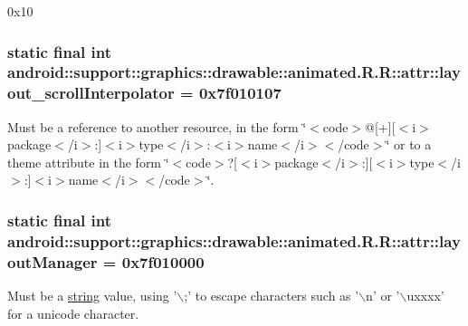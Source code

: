0x10\hypertarget{classandroid_1_1support_1_1graphics_1_1drawable_1_1animated_1_1_r_1_1attr_dc8d41cc769da401537d14c50cbd5109}{
\subsubsection[{layout\_\-scrollInterpolator}]{\setlength{\rightskip}{0pt plus 5cm}static final int android::support::graphics::drawable::animated.R.R::attr::layout\_\-scrollInterpolator = 0x7f010107}}
\label{classandroid_1_1support_1_1graphics_1_1drawable_1_1animated_1_1_r_1_1attr_dc8d41cc769da401537d14c50cbd5109}


Must be a reference to another resource, in the form \char`\"{}$<$code$>$@\mbox{[}+\mbox{]}\mbox{[}$<$i$>$package$<$/i$>$:\mbox{]}$<$i$>$type$<$/i$>$:$<$i$>$name$<$/i$>$$<$/code$>$\char`\"{} or to a theme attribute in the form \char`\"{}$<$code$>$?\mbox{[}$<$i$>$package$<$/i$>$:\mbox{]}\mbox{[}$<$i$>$type$<$/i$>$:\mbox{]}$<$i$>$name$<$/i$>$$<$/code$>$\char`\"{}. \hypertarget{classandroid_1_1support_1_1graphics_1_1drawable_1_1animated_1_1_r_1_1attr_35202098ebac7916e8289eaaf51403ff}{
\subsubsection[{layoutManager}]{\setlength{\rightskip}{0pt plus 5cm}static final int android::support::graphics::drawable::animated.R.R::attr::layoutManager = 0x7f010000}}
\label{classandroid_1_1support_1_1graphics_1_1drawable_1_1animated_1_1_r_1_1attr_35202098ebac7916e8289eaaf51403ff}


Must be a \hyperlink{classandroid_1_1support_1_1graphics_1_1drawable_1_1animated_1_1_r_1_1string}{string} value, using '$\backslash$;' to escape characters such as '$\backslash$n' or '$\backslash$uxxxx' for a unicode character. 

